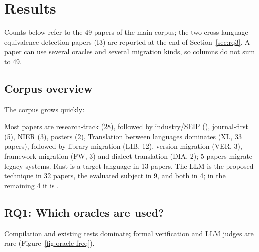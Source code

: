 \section{Results}
\label{sec:results}

Counts below refer to the 49 papers of the main corpus; the two cross-language equivalence-detection papers (I3) are reported at the end of Section~\ref{sec:rq3}. A paper can use several oracles and several migration kinds, so columns do not sum to 49.

\subsection{Corpus overview}
\label{sec:overview}

The corpus grows quickly: 

Most papers are research-track (28), followed by industry/SEIP (), journal-first (5), NIER (3), posters (2),  Translation between languages dominates (XL, 33 papers), followed by library migration (LIB, 12), version migration (VER, 3), framework migration (FW, 3) and dialect translation (DIA, 2); 5 papers migrate legacy systems. Rust is a target language in 13 papers. The LLM is the proposed technique in 32 papers, the evaluated subject in 9, and both in 4; in the remaining 4 it is .

\subsection{RQ1: Which oracles are used?}
\label{sec:rq1}

Compilation and existing tests dominate; formal verification and LLM judges are rare (Figure~\ref{fig:oracle-freq}). 


